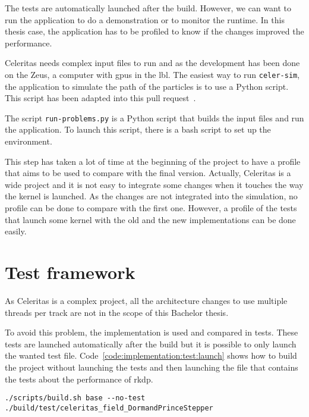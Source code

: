 The tests are automatically launched after the build.
However, we can want to run the application to do a demonstration or to
monitor the runtime.
In this thesis case, the application has to be profiled to know if the changes
improved the performance.

Celeritas needs complex input files to run and as the development has been done
on the Zeus, a computer with \acrshort{gpu}s in the \acrshort{lbl}.
The easiest way to run \texttt{celer-sim}, the application to simulate the
path of the particles is to use a Python script.
This script has been adapted into this pull request~\cite{regression-pull-request}.

The script \texttt{run-problems.py} is a Python script that builds the input
files and run the application.
To launch this script, there is a bash script to set up the environment.

This step has taken a lot of time at the beginning of the project to have a
profile that aims to be used to compare with the final version.
Actually, Celeritas is a wide project and it is not easy to integrate some
changes when it touches the way the kernel is launched.
As the changes are not integrated into the simulation, no profile can be done
to compare with the first one.
However, a profile of the tests that launch some kernel with the old and the new
implementations can be done easily.

\section{Test framework}
\label{ch:implementation:test}

As Celeritas is a complex project, all the architecture changes to use multiple
threads per track are not in the scope of this Bachelor thesis.

To avoid this problem, the implementation is used and compared in tests.
These tests are launched automatically after the build but it is possible to
only launch the wanted test file.
Code~\ref{code:implementation:test:launch} shows how to build the project
without launching the tests and then launching the file that contains the tests
about the performance of \acrshort{rkdp}.

\begin{code}
    \label{code:implementation:test:launch}
    \begin{verbatim}
./scripts/build.sh base --no-test
./build/test/celeritas_field_DormandPrinceStepper
    \end{verbatim}
\end{code}

